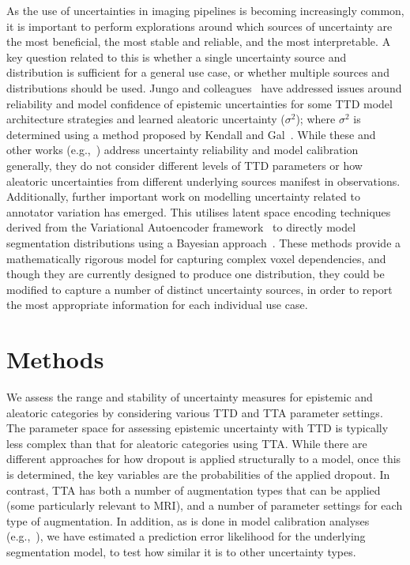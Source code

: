 \documentclass[runningheads]{llncs}
\begin{document}
As the use of uncertainties in imaging pipelines is becoming increasingly common, it is important to perform explorations around which sources of uncertainty are the most beneficial, the most stable and reliable, and the most interpretable. A key question related to this is whether a single uncertainty source and distribution is sufficient for a general use case, or whether multiple sources and distributions should be used.  
Jungo and colleagues~\cite{jungo_1,jungo_2} have addressed issues around reliability and model confidence of epistemic uncertainties for some TTD model architecture strategies and learned aleatoric uncertainty ($\sigma^2$); where $\sigma^2$ is determined using a method proposed by Kendall and Gal~\cite{kendall}. While these and other works (e.g.,~\cite{mehrtash,rousseau}) address uncertainty reliability and model calibration generally, they do not consider different levels of TTD parameters or how aleatoric uncertainties from different underlying sources manifest in observations. Additionally, further important work on modelling uncertainty related to annotator variation has emerged. This utilises latent space encoding techniques derived from the Variational Autoencoder framework~\cite{ref_kingma} to directly model segmentation distributions using a Bayesian approach~\cite{ref_kohl,ref_baumgartner}. These methods provide a mathematically rigorous model for capturing complex voxel dependencies, and though they are currently designed to produce one distribution, they could be modified to capture a number of distinct uncertainty sources, in order to report the most appropriate information for each individual use case.

\section{Methods}

We assess the range and stability of uncertainty measures for epistemic and aleatoric categories by considering various TTD and TTA parameter settings. The parameter space for assessing epistemic uncertainty with TTD is typically less complex than that for aleatoric categories using TTA. While there are different approaches for how dropout is applied structurally to a model, once this is determined, the key variables are the probabilities of the applied dropout. In contrast, TTA has both a number of augmentation types that can be applied (some particularly relevant to MRI), and a number of parameter settings for each type of augmentation. In addition, as is done in model calibration analyses (e.g.,~\cite{mehrtash,rousseau}), we have estimated a prediction error likelihood for the underlying segmentation model, to test how similar it is to other uncertainty types.
\end{document}
